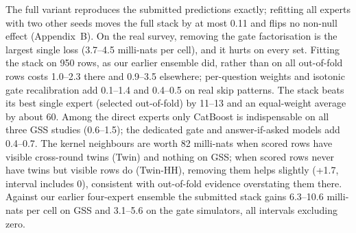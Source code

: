 The full variant reproduces the submitted predictions exactly; refitting all experts with two other seeds moves the full stack by at most 0.11 and flips no non-null effect (Appendix~B). On the real survey, removing the gate factorisation is the largest single loss (3.7--4.5 milli-nats per cell), and it hurts on every set. Fitting the stack on 950 rows, as our earlier ensemble did, rather than on all out-of-fold rows costs 1.0--2.3 there and 0.9--3.5 elsewhere; per-question weights and isotonic gate recalibration add 0.1--1.4 and 0.4--0.5 on real skip patterns. The stack beats its best single expert (selected out-of-fold) by 11--13 and an equal-weight average by about 60. Among the direct experts only CatBoost is indispensable on all three GSS studies (0.6--1.5); the dedicated gate and answer-if-asked models add 0.4--0.7. The kernel neighbours are worth 82 milli-nats when scored rows have visible cross-round twins (Twin) and nothing on GSS; when scored rows never have twins but visible rows do (Twin-HH), removing them helps slightly (+1.7, interval includes 0), consistent with out-of-fold evidence overstating them there. Against our earlier four-expert ensemble the submitted stack gains 6.3--10.6 milli-nats per cell on GSS and 3.1--5.6 on the gate simulators, all intervals excluding zero.
